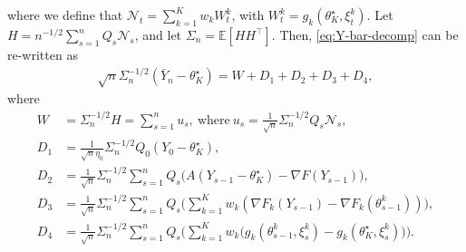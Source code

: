 \documentclass[a4paper,11pt]{article}
\numberwithin{equation}{section}
\theoremstyle{plain}
\theoremstyle{remark}
\def\IE{\mathbb{E}}
\newcommand{\minparam}{\theta^\star_K}
\begin{document}
where we define that $\mathcal{N}_t=\sum_{k=1}^K w_k W_t^k$, with $W_t^k= g_k(\minparam, \xi_t^k)$. Let $H= n^{-1/2} \sum_{s=1}^n Q_s \mathcal{N}_s$, and let $\Sigma_n = \IE[HH^\top]$. Then, \eqref{eq:Y-bar-decomp} can be re-written as 
\begin{align}
    \sqrt{n}\Sigma_n^{-1/2}(\bar{Y}_n - \minparam) = W + D_1 +  D_2 + D_3+ D_4, \label{eq:W-D decomposition}
\end{align}
where
\begin{align}
    W &= \Sigma_n^{-1/2}H = \sum_{s=1}^n u_s, \ \text{where} \ u_s= \frac{1}{\sqrt{n}}\Sigma_n^{-1/2} Q_s \mathcal{N}_s, \label{eq:W-def}\\
    D_1 &= \frac{1}{\sqrt{n}\eta_0} \Sigma_n^{-1/2} Q_0(Y_0-\minparam), \label{eq:D1-def}\\
    D_2 &= \frac{1}{\sqrt{n}}\Sigma_n^{-1/2}\sum_{s=1}^n Q_s\big(A(Y_{s-1} - \minparam)  - \nabla F(Y_{s-1})\big), \label{eq:D2-def}\\
    D_3 &= \frac{1}{\sqrt{n}} \Sigma_n^{-1/2}\sum_{s=1}^n Q_s \Big( \sum_{k=1}^K w_k (\nabla F_k(Y_{s-1}) - \nabla F_k(\theta_{s-1}^k)) \Big), \label{eq:D3-def}\\
    D_4 &= \frac{1}{\sqrt{n}} \Sigma_n^{-1/2}\sum_{s=1}^n Q_s \Big( \sum_{k=1}^K w_k \big(g_k(\theta_{s-1}^k, \xi_s^k)-g_k(\minparam, \xi_s^k) \big) \Big). \label{eq:D4-def}
\end{align}
\end{document}
